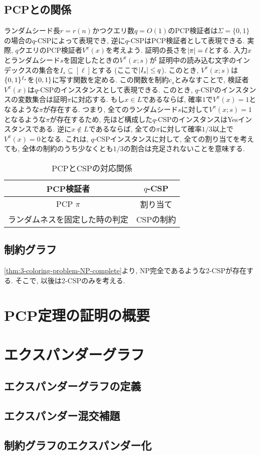 \subsection{PCPとの関係}
ランダムシード長$r=r(n)$かつクエリ数$q=O(1)$のPCP検証者は$\Sigma=\{0,1\}$の場合の$q$-CSPによって表現でき, 逆に$q$-CSPはPCP検証者として表現できる.
実際, $q$クエリのPCP検証者$V^\pi(x)$を考えよう.
証明の長さを$\abs{\pi}=\ell$とする.
入力$x$とランダムシード$s$を固定したときの$V^\pi(x;s)$が
証明中の読み込む文字のインデックスの集合を$I_s\subseteq[\ell]$とする (ここで$\abs{I_s}\le q$).
このとき, $V^\pi(x;s)$は$\{0,1\}^{I_s}$を$\{0,1\}$に写す関数を定める.
この関数を制約$c_s$とみなすことで, 検証者$V^\pi(x)$は$q$-CSPのインスタンスとして表現できる.
このとき, $q$-CSPのインスタンスの変数集合は証明$\pi$に対応する.
もし$x\in L$であるならば, 確率$1$で$V^\pi(x)=1$となるような$\pi$が存在する.
つまり, 全てのランダムシード$s$に対して$V^\pi(x;s)=1$となるような$\pi$が存在するため,
先ほど構成した$q$-CSPのインスタンスはYesインスタンスである.
逆に$x\not\in L$であるならば, 全ての$\pi$に対して確率$1/3$以上で$V^\pi(x)=0$となる.
これは, $q$-CSPインスタンスに対して, 全ての割り当てを考えても, 全体の制約のうち少なくとも$1/3$の割合は充足されないことを意味する.


\begin{table}[htbp]
  \centering
  \begin{tabular}{|c|c|}
    \hline
    PCP検証者 & $q$-CSP \\
    \hline
    PCP $\pi$ & 割り当て \\
    \hline
    ランダムネスを固定した時の判定 & CSPの制約 \\
    \hline
  \end{tabular}
  \caption{PCPとCSPの対応関係}
  \label{table:pcp-csp-correspondence}
\end{table}

\subsection{制約グラフ}
\cref{thm:3-coloring-problem-NP-complete}より, NP完全であるような2-CSPが存在する.
そこで, 以後は2-CSPのみを考える.

\section{PCP定理の証明の概要}

\section{エクスパンダーグラフ}
\subsection{エクスパンダーグラフの定義}
\subsection{エクスパンダー混交補題}
\subsection{制約グラフのエクスパンダー化}